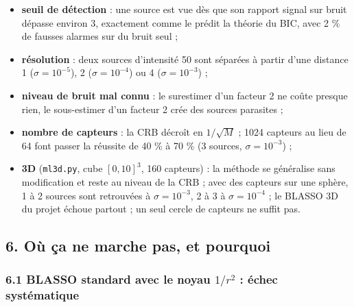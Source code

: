 \documentclass[
  french,
]{article}
\providecommand{\tightlist}{%
  \setlength{\itemsep}{0pt}\setlength{\parskip}{0pt}}
\begin{document}
\begin{itemize}
\tightlist
\item
  \textbf{seuil de détection} : une source est vue dès que son rapport
  signal sur bruit dépasse environ 3, exactement comme le prédit la
  théorie du BIC, avec 2 \% de fausses alarmes sur du bruit seul ;
\item
  \textbf{résolution} : deux sources d'intensité 50 sont séparées à
  partir d'une distance 1 (\(\sigma = 10^{-5}\)), 2
  (\(\sigma = 10^{-4}\)) ou 4 (\(\sigma = 10^{-3}\)) ;
\item
  \textbf{niveau de bruit mal connu} : le surestimer d'un facteur 2 ne
  coûte presque rien, le sous-estimer d'un facteur 2 crée des sources
  parasites ;
\item
  \textbf{nombre de capteurs} : la CRB décroît en \(1/\sqrt M\) ; 1024
  capteurs au lieu de 64 font passer la réussite de 40 \% à 70 \% (3
  sources, \(\sigma = 10^{-3}\)) ;
\item
  \textbf{3D} (\texttt{ml3d.py}, cube \([0,10]^3\), 160 capteurs) : la
  méthode se généralise sans modification et reste au niveau de la CRB ;
  avec des capteurs sur une sphère, 1 à 2 sources sont retrouvées à
  \(\sigma = 10^{-3}\), 2 à 3 à \(\sigma = 10^{-4}\) ; le BLASSO 3D du
  projet échoue partout ; un seul cercle de capteurs ne suffit pas.
\end{itemize}

\subsection{6. Où ça ne marche pas, et
pourquoi}\label{ouxf9-uxe7a-ne-marche-pas-et-pourquoi}

\subsubsection{\texorpdfstring{6.1 BLASSO standard avec le noyau
\(1/r^2\) : échec
systématique}{6.1 BLASSO standard avec le noyau 1/r\^{}2 : échec systématique}}\label{blasso-standard-avec-le-noyau-1r2-uxe9chec-systuxe9matique}
\end{document}
